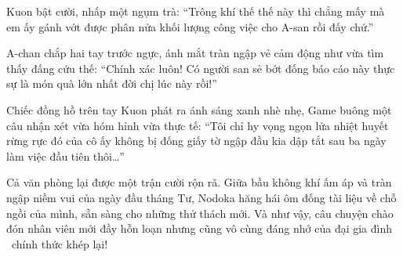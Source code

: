 \documentclass[../main.tex]{subfiles}
\begin{document}
Kuon bật cười, nhấp một ngụm trà: ``Trông khí thế thế này thì chẳng mấy mà em ấy gánh vớt được phân nửa khối lượng công việc cho A-san rồi đấy chứ.''

A-chan chắp hai tay trước ngực, ánh mắt tràn ngập vẻ cảm động như vừa tìm thấy đấng cứu thế: ``Chính xác luôn! Có người san sẻ bớt đống báo cáo này thực sự là món quà lớn nhất đời chị lúc này rồi!''

Chiếc đồng hồ trên tay Kuon phát ra ánh sáng xanh nhè nhẹ, Game buông một câu nhận xét vừa hóm hỉnh vừa thực tế: ``Tôi chỉ hy vọng ngọn lửa nhiệt huyết rừng rực đó của cô ấy không bị đống giấy tờ ngập đầu kia dập tắt sau ba ngày làm việc đầu tiên thôi\dots''

Cả văn phòng lại được một trận cười rộn rã. Giữa bầu không khí ấm áp và tràn ngập niềm vui của ngày đầu tháng Tư, Nodoka hăng hái ôm đống tài liệu về chỗ ngồi của mình, sẵn sàng cho những thử thách mới. Và như vậy, câu chuyện chào đón nhân viên mới đầy hỗn loạn nhưng cũng vô cùng đáng nhớ của đại gia đình \hll\ chính thức khép lại!
\end{document}
